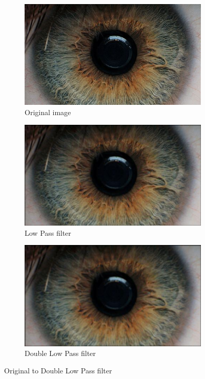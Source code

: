 \documentclass{article}
\begin{document}
%
%
\begin{figure}[H]
\centering

\begin{subfigure}{.3\textwidth}
  \centering
  \includegraphics[width=0.9\linewidth]{res/index.jpg}
  \caption{Original image}
  \label{fig:}
\end{subfigure}%
\begin{subfigure}{.3\textwidth}
  \centering
  \includegraphics[width=0.9\linewidth]{res/pupil/low_pass_n.jpg}
  \caption{Low Pass filter}
  \label{fig:}
\end{subfigure}
\begin{subfigure}{.3\textwidth}
  \centering
  \includegraphics[width=0.9\linewidth]{res/pupil/low_pass_nn.jpg}
  \caption{Double Low Pass filter}
  \label{fig:}
\end{subfigure}


\caption{Original to Double Low Pass filter}
\label{fig:result_pup_orig_low}
\end{figure}
\end{document}
